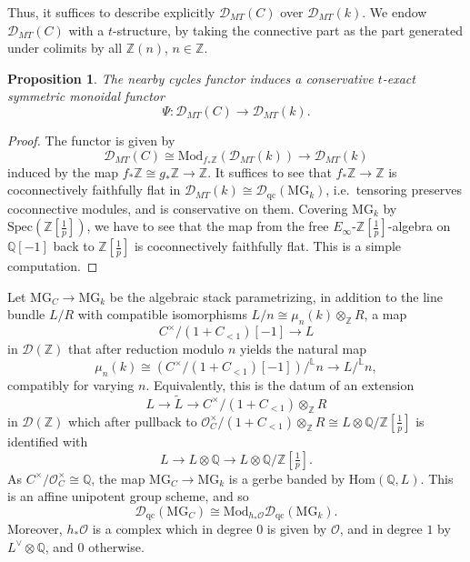 \documentclass[11pt]{amsart}
\numberwithin{equation}{section}
\numberwithin{theorem}{section}
\newtheorem{proposition}[theorem]{Proposition}
\theoremstyle{definition}
\begin{document}
Thus, it suffices to describe explicitly $\mathcal D_{MT}(C)$ over $\mathcal D_{MT}(k)$. We endow $\mathcal D_{MT}(C)$ with a $t$-structure, by taking the connective part as the part generated under colimits by all $\mathbb Z(n)$, $n\in \mathbb Z$.

\begin{proposition} The nearby cycles functor induces a conservative $t$-exact symmetric monoidal functor
\[
\Psi: \mathcal D_{MT}(C)\to \mathcal D_{MT}(k).
\]
\end{proposition}

\begin{proof} The functor is given by
\[
\mathcal D_{MT}(C)\cong \mathrm{Mod}_{f_\ast \mathbb Z}(\mathcal D_{MT}(k))\to \mathcal D_{MT}(k)
\]
induced by the map $f_\ast \mathbb Z\cong g_\ast \mathbb Z\to \mathbb Z$. It suffices to see that $f_\ast \mathbb Z\to \mathbb Z$ is coconnectively faithfully flat in $\mathcal D_{MT}(k)\cong \mathcal D_{\mathrm{qc}}(\mathrm{MG}_k)$, i.e.~tensoring preserves coconnective modules, and is conservative on them. Covering $\mathrm{MG}_k$ by $\mathrm{Spec}(\mathbb Z[\tfrac 1p])$, we have to see that the map from the free $E_\infty$-$\mathbb Z[\tfrac 1p]$-algebra on $\mathbb Q[-1]$ back to $\mathbb Z[\tfrac 1p]$ is coconnectively faithfully flat. This is a simple computation.
\end{proof}

Let $\mathrm{MG}_C\to \mathrm{MG}_k$ be the algebraic stack parametrizing, in addition to the line bundle $L/R$ with compatible isomorphisms $L/n\cong \mu_n(k)\otimes_\mathbb Z R$, a map
\[
C^\times/(1+C_{<1})[-1]\to L
\]
in $\mathcal D(\mathbb Z)$ that after reduction modulo $n$ yields the natural map
\[
\mu_n(k)\cong (C^\times/(1+C_{<1})[-1])/^\mathbb L n\to L/^{\mathbb L} n,
\]
compatibly for varying $n$. Equivalently, this is the datum of an extension
\[
L\to \tilde{L}\to C^\times/(1+C_{<1})\otimes_{\mathbb Z} R
\]
in $\mathcal D(\mathbb Z)$ which after pullback to $\mathcal O_C^\times/(1+C_{<1})\otimes_{\mathbb Z} R\cong L\otimes \mathbb Q/\mathbb Z[\tfrac 1p]$ is identified with
\[
L\to L\otimes \mathbb Q\to L\otimes \mathbb Q/\mathbb Z[\tfrac 1p].
\]
As $C^\times/\mathcal O_C^\times\cong \mathbb Q$, the map $\mathrm{MG}_C\to \mathrm{MG}_k$ is a gerbe banded by $\mathrm{Hom}(\mathbb Q,L)$. This is an affine unipotent group scheme, and so
\[
\mathcal D_{\mathrm{qc}}(\mathrm{MG}_C)\cong \mathrm{Mod}_{h_\ast \mathcal O} \mathcal D_{\mathrm{qc}}(\mathrm{MG}_k).
\]
Moreover, $h_\ast \mathcal O$ is a complex which in degree $0$ is given by $\mathcal O$, and in degree $1$ by $L^\vee\otimes \mathbb Q$, and $0$ otherwise.
\end{document}
